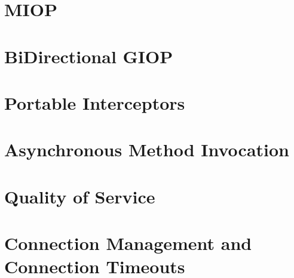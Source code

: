 \documentclass[12pt]{scrbook}
\begin{document}



\chapter{MIOP}
\label{ch:miop}




\chapter{BiDirectional GIOP}
\label{ch:bidir}




\chapter{Portable Interceptors}
\label{ch:pi}




\chapter{Asynchronous Method Invocation}
\label{ch:AMI}




\chapter{Quality of Service}
\label{ch:qos}




\chapter{Connection Management and Connection Timeouts}
\label{ch:connections}


\end{document}
